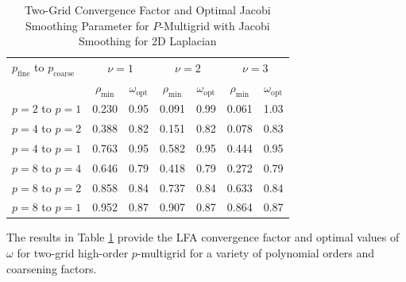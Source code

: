 \begin{table}[ht!]
\begin{center}
\begin{tabular}{l cc cc cc}
  \toprule
  $p_{\text{fine}}$ to $p_{\text{coarse}}$  &  \multicolumn{2}{c}{$\nu = 1$}  &  \multicolumn{2}{c}{$\nu = 2$}  &  \multicolumn{2}{c}{$\nu = 3$}  \\
                      &  $\rho_{\min}$  &  $\omega_{\text{opt}}$  &  $\rho_{\min}$ & $\omega_{\text{opt}}$  &  $\rho_{\min}$ & $\omega_{\text{opt}}$  \\
  \toprule
  $p = 2$ to $p = 1$  &  0.230 & 0.95  &  0.091 & 0.99  &  0.061 & 1.03   \\
  \midrule
  $p = 4$ to $p = 2$  &  0.388 & 0.82  &  0.151 & 0.82  &  0.078 & 0.83   \\
  $p = 4$ to $p = 1$  &  0.763 & 0.95  &  0.582 & 0.95  &  0.444 & 0.95   \\
  \midrule
  $p = 8$ to $p = 4$  &  0.646 & 0.79  &  0.418 & 0.79  &  0.272 & 0.79   \\
  $p = 8$ to $p = 2$  &  0.858 & 0.84  &  0.737 & 0.84  &  0.633 & 0.84   \\
  $p = 8$ to $p = 1$  &  0.952 & 0.87  &  0.907 & 0.87  &  0.864 & 0.87   \\
  \bottomrule
\end{tabular}
\end{center}
\caption{Two-Grid Convergence Factor and Optimal Jacobi Smoothing Parameter for $P$-Multigrid with Jacobi Smoothing for 2D Laplacian}
\label{table:two_grid_2d}
\end{table}

The results in Table \ref{table:two_grid_2d} provide the LFA convergence factor and optimal values of $\omega$ for two-grid high-order $p$-multigrid for a variety of polynomial orders and coarsening factors.


